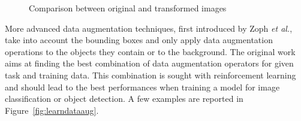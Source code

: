 \documentclass[%
    corpo=12pt,
    twoside,
    stile=classica,   
    tipotesi=magistrale,
    evenboxes,
    english,
	numerazioneromana,
]{toptesi}
\begin{document}
\begin{figure}[ht]
	\centering
	\caption{Comparison between original and transformed images}
	\label{fig:augs}
\end{figure}

\bigskip
More advanced data augmentation techniques, first introduced by Zoph \textit{et al.}\cite{zoph2019learning}, take into account the bounding boxes and only apply data augmentation operations to the objects they contain or to the background. The original work aims at finding the best combination of data augmentation operators for given task and training data. This combination is sought with reinforcement learning and should lead to the best performances when training a model for image classification or object detection. A few examples are reported in Figure~\ref{fig:learndataaug}.
\end{document}
